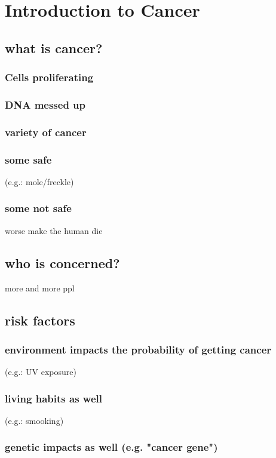 \section{Introduction to Cancer}

\subsection{what is cancer?}
\subsubsection{Cells proliferating}
\subsubsection{DNA messed up}
\subsubsection{variety of cancer}
\subsubsection{some safe}
 (e.g.: mole/freckle)
\subsubsection{some not safe}
worse make the human die

\subsection{who is concerned?}
more and more ppl
\subsection{risk factors}
\subsubsection{environment impacts the probability of getting cancer}
(e.g.: UV exposure)
\subsubsection{living habits as well}
(e.g.: smooking)
\subsubsection{genetic impacts as well (e.g. "cancer gene")}
	
